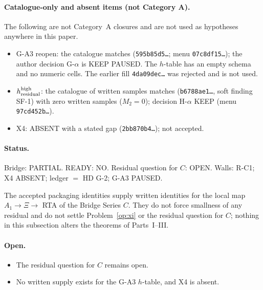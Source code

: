 \paragraph{Catalogue-only and absent items (not Category A).} The following are not Category~A closures and are not used as hypotheses anywhere in this paper.
\begin{itemize}
\item G-A3 reopen: the catalogue matches (\texttt{595b85d5\ldots}; menu \texttt{07c8df15\ldots}); the author decision G-$\alpha$ is KEEP PAUSED. The $h$-table has an empty schema and no numeric cells. The earlier fill \texttt{4da09dec\ldots} was rejected and is not used.
\item $h_{\rm residual}^{\rm high}$: the catalogue of written samples matches (\texttt{b6788ae1\ldots}, soft finding SF-1) with zero written samples ($M_2=0$); decision H-$\alpha$ KEEP (menu \texttt{97cd452b\ldots}).
\item X4: ABSENT with a stated gap (\texttt{2bb870b4\ldots}); not accepted.
\end{itemize}

\paragraph{Status.} Bridge: PARTIAL. READY: NO. Residual question for $C$: OPEN. Walls: R-C1; X4 ABSENT; ledger $=$ HD G-2; G-A3 PAUSED.

\begin{remark}
The accepted packaging identities supply written identities for the local map $A_1\to\Xi\to$ RTA of the Bridge Series $C$. They do not force smallness of any residual and do not settle Problem~\ref{op:xi} or the residual question for $C$; nothing in this subsection alters the theorems of Parts~I--III.
\end{remark}

\paragraph{Open.}
\begin{itemize}
\item The residual question for $C$ remains open.
\item No written supply exists for the G-A3 $h$-table, and X4 is absent.
\end{itemize}
